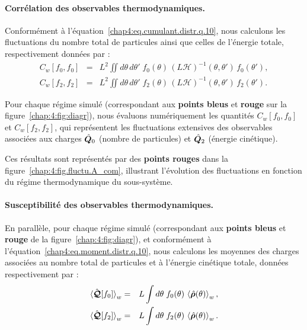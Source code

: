 \paragraph{Corrélation des observables thermodynamiques.}

\medskip
Conformément à l’équation~\eqref{chap4:eq.cumulant.distr.q.10}, nous calculons les fluctuations du nombre total de particules ainsi que celles de l’énergie totale, respectivement données par :
\begin{eqnarray}
	C_w[f_0,f_0]  & = & L^2 \iint d\theta\, d\theta'\; f_0(\theta)\, (L\mathcal{H})^{-1}(\theta , \theta')\, f_0(\theta') ,\\
	C_w[f_2,f_2]  & = & L^2 \iint d\theta\, d\theta'\; f_2(\theta)\,(L\mathcal{H})^{-1}(\theta , \theta')\, f_2(\theta').
\end{eqnarray}

Pour chaque régime simulé (correspondant aux {\bf points bleus} et {\bf rouge} sur la figure~\eqref{chap:4:fig:diagr}), nous évaluons numériquement les quantités \( C_w[f_0,f_0] \) et \( C_w[f_2,f_2] \), qui représentent les fluctuations extensives des observables associées aux charges \( \hat{\bm{Q}}_0 \) (nombre de particules) et \( \hat{\bm{Q}}_2 \) (énergie cinétique).

\medskip

Ces résultats sont représentés par des {\bf points rouges} dans la figure~\ref{chap:4:fig.fluctu.A_com}, illustrant l’évolution des fluctuations en fonction du régime thermodynamique du sous-système.


\paragraph{Susceptibilité des observables thermodynamiques.}

\medskip
En parallèle, pour chaque régime simulé (correspondant aux {\bf points bleus} et {\bf rouge} de la figure~\eqref{chap:4:fig:diagr}), et conformément à l’équation~\eqref{chap4:eq.moment.distr.q.10}, nous calculons les moyennes des charges associées au nombre total de particules et à l’énergie cinétique totale, données respectivement par :
\begin{eqnarray}
	\braket{\hat{\bm{\mathcal{Q}}}[f_0]}_w & = & L \int d\theta\; f_0(\theta)\, \braket{\hat{\bm{\rho}}(\theta)}_w,\\
	\braket{\hat{\bm{\mathcal{Q}}}[f_2]}_w & = & L \int d\theta\; f_2(\theta)\, \braket{\hat{\bm{\rho}}(\theta)}_w.
\end{eqnarray}

